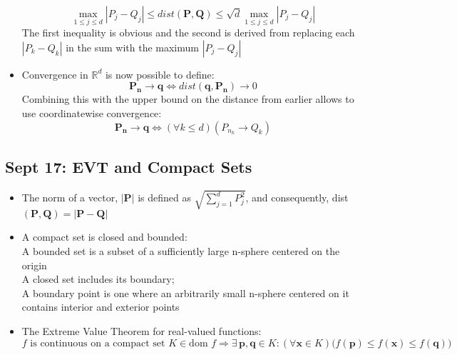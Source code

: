 \documentclass[10pt, oneside]{article}
\let\leq\leqslant
\newcommand{\R}{\mathbb{R}}
\renewcommand{\vec}[1]{\mathbf{#1}}
\begin{document}
\begin{itemize}
        \[\max_{1\leq j \leq d} |P_j - Q_j| \leq dist(\vec{P},\vec{Q}) \leq \sqrt{d} \max_{1 \leq j \leq d} |P_j - Q_j| \]
        The first inequality is obvious and the second is derived from replacing each $|P_k - Q_k|$ in the sum with the maximum $|P_j - Q_j|$
    \item Convergence in $\R^d$ is now possible to define:
        \[\vec{P_n} \rightarrow \vec{q} \Leftrightarrow dist(\vec{q},\vec{P_n}) \rightarrow 0\]
        Combining this with the upper bound on the distance from earlier allows to use coordinatewise convergence:
        \[\vec{P_n} \rightarrow \vec{q} \Leftrightarrow (\forall k \leq d)(P_{n_k} \rightarrow Q_k)\]
\end{itemize}

\subsection{Sept 17: EVT and Compact Sets}
\begin{itemize}
    \item The norm of a vector,  $|\vec{P}|$ is defined as $\displaystyle \sqrt{\sum_{j=1}^d{P_j^2}}$, and consequently, dist $(\vec{P},\vec{Q}) = |\vec{P}-\vec{Q}|$
    \item A compact set is closed and bounded:\\
    A bounded set is a subset of a sufficiently large n-sphere centered on the origin\\
    A closed set includes its boundary;\\ 
    A boundary point is one where an arbitrarily small n-sphere centered on it contains interior and exterior points
    \item The Extreme Value Theorem for real-valued functions:
        \[f \text{ is continuous on a compact set } K \in \text{dom } f \Rightarrow \exists \, \vec{p},\vec{q} \in K : (\forall \vec{x} \in K) \big( f(\vec{p}) \leq f(\vec{x}) \leq f(\vec{q}) \big)\]
\end{itemize}
\end{document}
